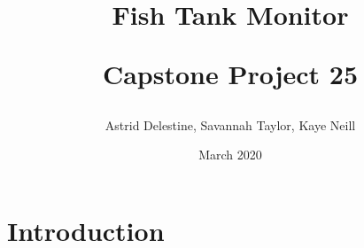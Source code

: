 \documentclass{report}
\title{
 Fish Tank Monitor \\ 
\begin{large} 
Capstone Project 25
\end{large} }
\author{Astrid Delestine, Savannah Taylor, Kaye Neill }
\date{March 2020}
\begin{document}
\maketitle

\section{Introduction}
\end{document}
